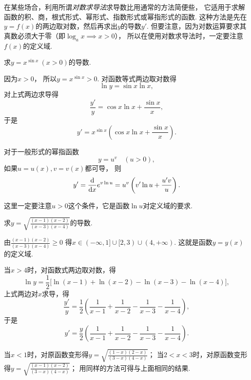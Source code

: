 
在某些场合，利用所谓\emph{对数求导法}求导数比用通常的方法简便些，
它适用于求解函数的积、商，根式形式、幂形式、指数形式或幂指形式的函数.
这种方法是先在\(y=f(x)\)的两边取对数，然后再求出\(y\)的导数\(y'\).
但要注意，因为对数运算要求其真数必须大于零（即\(\log_a x \implies x>0\)），
所以在使用对数求导法时，一定要注意\(f(x)\)的定义域.

\begin{example}
求\(y=x^{\sin x}\ (x>0)\)的导数.
\begin{solution}
因为\(x > 0\)，
所以\(y=x^{\sin x} > 0\).
对函数等式两边取对数得\[
	\ln y = \sin x \ln x,
\]
对上式两边求导得\[
	\frac{y'}{y} = \cos x \ln x + \frac{\sin x}{x},
\]
于是\[
	y' = x^{\sin x} \left( \cos x \ln x + \frac{\sin x}{x} \right).
\]
\end{solution}
\end{example}

\begin{theorem}
对于一般形式的幂指函数\[
	y = u^v
	\quad(u > 0),
\]
如果\(u=u(x),v=v(x)\)都可导，
则\begin{equation}
	y' = \dv{x} e^{v \ln u}
	= u^v \left( v' \ln u + \frac{u'v}{u} \right).
\end{equation}
\end{theorem}
这里一定要注意\(u>0\)这个条件，它是函数\(\ln u\)对定义域的要求.

\begin{example}
求\(y=\sqrt{\frac{(x-1)(x-2)}{(x-3)(x-4)}}\)的导数.
\begin{solution}
由\(\frac{(x-1)(x-2)}{(x-3)(x-4)}\geq0\)
得\(x \in (-\infty,1]\cup[2,3)\cup(4,+\infty)\).
这就是函数\(y=y(x)\)的定义域.

当\(x>4\)时，对函数式两边取对数，得\[
	\ln y = \frac{1}{2} \bigl[
		\ln(x-1)+\ln(x-2)-\ln(x-3)-\ln(x-4)
	\bigr],
\]
上式两边对\(x\)求导，得\[
	\frac{y'}{y} = \frac{1}{2} \left(
		\frac{1}{x-1} + \frac{1}{x-2} - \frac{1}{x-3} - \frac{1}{x-4}
	\right),
\]
于是\[
	y' = \frac{y}{2} \left(
		\frac{1}{x-1} + \frac{1}{x-2} - \frac{1}{x-3} - \frac{1}{x-4}
	\right).
\]

当\(x<1\)时，对原函数变形得\(y=\sqrt{\frac{(1-x)(2-x)}{(3-x)(4-x)}}\)；
当\(2<x<3\)时，对原函数变形得\(y=\sqrt{\frac{(x-1)(x-2)}{(3-x)(4-x)}}\)；
用同样的方法可得与上面相同的结果.
\end{solution}
\end{example}

